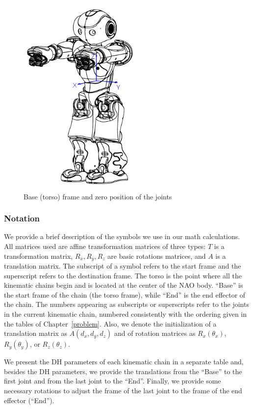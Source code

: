 \begin{figure}[h]
\begin{center}
\includegraphics[height = 10cm]{Figures/torso_frame.png}
\caption{Base (torso) frame and zero position of the joints}
\label{fig:torso}
\end{center}
\end{figure}


\subsubsection*{Notation}
We provide a brief description of the symbols we use in our math calculations. All matrices used are affine transformation matrices of three types: $T$ is a transformation matrix, $R_x, R_y, R_z$ are basic rotations matrices, and $A$ is a translation matrix. The subscript of a symbol refers to the start frame and the superscript refers to the destination frame. The torso is the point where all the kinematic chains begin and is located at the center of the NAO body. ``Base'' is the start frame of the chain (the torso frame), while ``End'' is the end effector of the chain. The numbers appearing as subscripts or superscripts refer to the joints in the current kinematic chain, numbered consistently with the ordering given in the tables of Chapter~\ref{problem}. Also, we denote the initialization of a translation matrix as $A(d_x,d_y,d_z)$ and of rotation matrices as $R_x(\theta_x)$, $R_y(\theta_y)$, or $R_z(\theta_z)$.

We present the DH parameters of each kinematic chain in a separate table and, besides the DH parameters, we provide the translations from the ``Base'' to the first joint and from the last joint to the ``End''. Finally, we provide some necessary rotations to adjust the frame of the last joint to the frame of the end effector (``End'').


